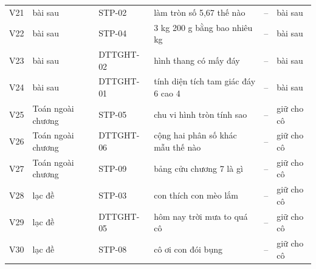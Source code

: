 {\begin{tabular}{@{}lllp{7.4cm}rl@{}}
V21 & bài sau & STP-02 & làm tròn số 5,67 thế nào & -- & bài sau \\
V22 & bài sau & STP-04 & 3 kg 200 g bằng bao nhiêu kg & -- & bài sau \\
V23 & bài sau & DTTGHT-02 & hình thang có mấy đáy & -- & bài sau \\
V24 & bài sau & DTTGHT-01 & tính diện tích tam giác đáy 6 cao 4 & -- & bài sau \\
V25 & Toán ngoài chương & STP-05 & chu vi hình tròn tính sao & -- & giữ cho cô \\
V26 & Toán ngoài chương & DTTGHT-06 & cộng hai phân số khác mẫu thế nào & -- & giữ cho cô \\
V27 & Toán ngoài chương & STP-09 & bảng cửu chương 7 là gì & -- & giữ cho cô \\
V28 & lạc đề & STP-03 & con thích con mèo lắm & -- & giữ cho cô \\
V29 & lạc đề & DTTGHT-05 & hôm nay trời mưa to quá cô & -- & giữ cho cô \\
V30 & lạc đề & STP-08 & cô ơi con đói bụng & -- & giữ cho cô \\
\bottomrule
\end{tabular}
}
